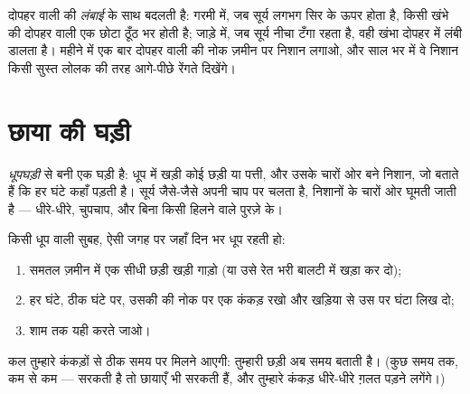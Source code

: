 \begin{example}[छाया से ऋतु पढ़ना]\label{ex:g3:sun-days-seasons:shadowlength}
दोपहर वाली  की \emph{लंबाई}  के साथ बदलती है: गरमी में, जब
सूर्य लगभग सिर के ऊपर होता है, किसी खंभे की दोपहर वाली  एक छोटा
ठूँठ भर होती है; जाड़े में, जब सूर्य नीचा टँगा रहता है, वही खंभा
दोपहर में लंबी  डालता है। महीने में एक बार दोपहर वाली  की नोक
ज़मीन पर निशान लगाओ, और साल भर में वे निशान किसी सुस्त लोलक की तरह
आगे-पीछे रेंगते दिखेंगे।
\end{example}

\section{छाया की घड़ी}

\begin{definition}[धूपघड़ी]\label{def:g3:sun-days-seasons:sundial}
\emph{धूपघड़ी}  से बनी एक घड़ी है: धूप में खड़ी
कोई छड़ी या पत्ती, और उसके चारों ओर बने निशान, जो बताते हैं कि हर
घंटे  कहाँ पड़ती है। सूर्य जैसे-जैसे अपनी चाप पर चलता है,
 निशानों के चारों ओर घूमती जाती है --- धीरे-धीरे, चुपचाप, और बिना
किसी हिलने वाले पुरज़े के।
\end{definition}

\begin{method}[छाया की घड़ी बनाना]\label{met:g3:sun-days-seasons:build}
किसी धूप वाली सुबह, ऐसी जगह पर जहाँ दिन भर धूप रहती हो:
\begin{enumerate}
  \item समतल ज़मीन में एक सीधी छड़ी खड़ी गाड़ो (या उसे रेत भरी बालटी
        में खड़ा कर दो);
  \item हर घंटे, ठीक घंटे पर, उसकी  की नोक पर एक कंकड़ रखो और
        खड़िया से उस पर घंटा लिख दो;
  \item शाम तक यही करते जाओ।
\end{enumerate}
कल  तुम्हारे कंकड़ों से ठीक समय पर मिलने आएगी: तुम्हारी छड़ी अब
समय बताती है। (कुछ समय तक, कम से कम ---  सरकती है तो छायाएँ भी
सरकती हैं, और तुम्हारे कंकड़ धीरे-धीरे ग़लत पड़ने लगेंगे।)
\end{method}

